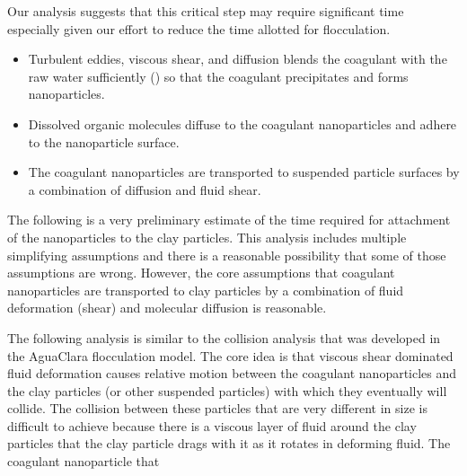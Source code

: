 \documentclass[letterpaper,10pt,english]{sphinxmanual}
\begin{document}
Our analysis suggests that this critical step may require significant time especially given our effort to reduce the time allotted for flocculation.
\begin{itemize}
\item {} 
Turbulent eddies, viscous shear, and diffusion blends the coagulant with the raw water sufficiently ({\hyperref[\detokenize{Rapid_Mix/RM_Intro:heading-mixing-time}]{}}) so that the coagulant precipitates and forms nanoparticles.

\item {} 
Dissolved organic molecules diffuse to the coagulant nanoparticles and adhere to the nanoparticle surface.

\item {} 
The coagulant nanoparticles are transported to suspended particle surfaces by a combination of diffusion and fluid shear.

\end{itemize}

The following is a very preliminary estimate of the time required for attachment of the nanoparticles to the clay particles. This analysis includes multiple simplifying assumptions and there is a reasonable possibility that some of those assumptions are wrong. However, the core assumptions that coagulant nanoparticles are transported to clay particles by a combination of fluid deformation (shear) and molecular diffusion is reasonable.

The following analysis is similar to the collision analysis that was developed in the AguaClara flocculation model. The core idea is that viscous shear dominated fluid deformation causes relative motion between the coagulant nanoparticles and the clay particles (or other suspended particles) with which they eventually will collide. The collision between these particles that are very different in size is difficult to achieve because there is a viscous layer of fluid around the clay particles that the clay particle drags with it as it rotates in deforming fluid. The coagulant nanoparticle that
\end{document}
